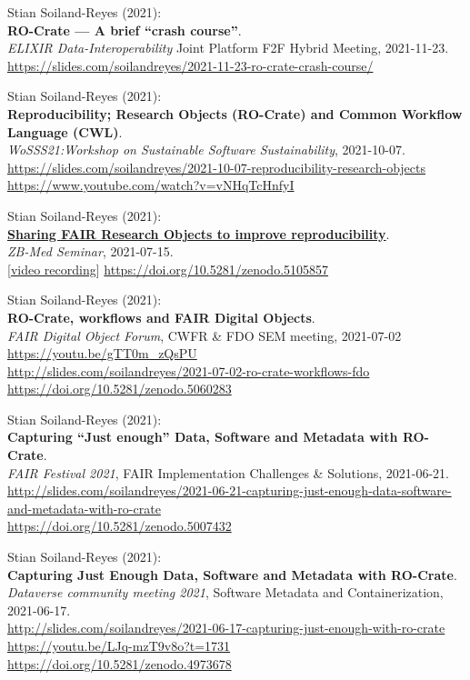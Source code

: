 Stian Soiland-Reyes (2021):\\
\textbf{RO-Crate --- A brief ``crash course''}.\\
\emph{ELIXIR Data-Interoperability} Joint Platform F2F Hybrid Meeting, 2021-11-23.\\
\url{https://slides.com/soilandreyes/2021-11-23-ro-crate-crash-course/}

Stian Soiland-Reyes (2021):\\
\textbf{Reproducibility; Research Objects (RO-Crate) and Common Workflow Language (CWL)}.\\
\emph{{WoSSS21}:Workshop
on Sustainable Software Sustainability}, 2021-10-07.\\
\url{https://slides.com/soilandreyes/2021-10-07-reproducibility-research-objects}\\
\url{https://www.youtube.com/watch?v=vNHqTcHnfyI}

Stian Soiland-Reyes (2021):\\
\href{http://slides.com/soilandreyes/2021-07-15-sharing-fair-research-objects}{\textbf{Sharing
FAIR Research Objects to improve reproducibility}}.\\
\emph{ZB-Med Seminar}, 2021-07-15.\\
{[}\href{https://youtu.be/CL_fqtQRPmw}{video recording}{]}
\url{https://doi.org/10.5281/zenodo.5105857}

Stian Soiland-Reyes (2021):\\
\textbf{RO-Crate, workflows and FAIR Digital Objects}.\\
\emph{FAIR Digital Object Forum}, {CWFR \& FDO SEM meeting}, 2021-07-02\\
\url{https://youtu.be/gTT0m_zQsPU}\\
\url{http://slides.com/soilandreyes/2021-07-02-ro-crate-workflows-fdo}\\
\url{https://doi.org/10.5281/zenodo.5060283}


Stian Soiland-Reyes (2021):\\
\textbf{Capturing ``Just enough'' Data, Software and Metadata with RO-Crate}.\\
\emph{FAIR Festival 2021}, FAIR Implementation Challenges \& Solutions, 2021-06-21. \\
\url{http://slides.com/soilandreyes/2021-06-21-capturing-just-enough-data-software-and-metadata-with-ro-crate}\\
\url{https://doi.org/10.5281/zenodo.5007432}

Stian Soiland-Reyes (2021):\\
\textbf{Capturing Just Enough Data, Software and Metadata with RO-Crate}.\\
\emph{{Dataverse community meeting 2021}}, Software Metadata and Containerization, 2021-06-17.\\
\url{http://slides.com/soilandreyes/2021-06-17-capturing-just-enough-with-ro-crate}\\
\url{https://youtu.be/LJq-mzT9v8o?t=1731} \\
\url{https://doi.org/10.5281/zenodo.4973678}

